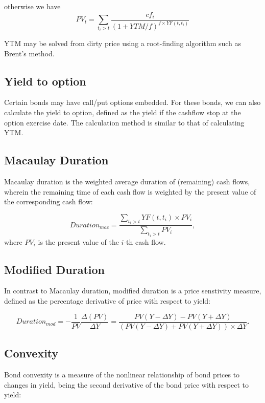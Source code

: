 otherwise we have
\begin{equation}
  PV_t = \sum_{t_i>t} \frac{cf_i}{ (1+YTM/f)^{f\times YF(t,t_i)} }
\end{equation}

YTM may be solved from dirty price using a root-finding algorithm such as
Brent's method. 

\subsection{Yield to option}

Certain bonds may have call/put options embedded. For these bonds, we can 
also calculate the yield to option, defined as the yield if the cashflow stop at
the option exercise date. The calculation method is similar to that of
calculating YTM.

\subsection{Macaulay Duration}
Macaulay duration is the weighted average duration of (remaining) cash flows,
wherein the remaining time of each cash flow is weighted by the present value of
the corresponding cash flow:

\begin{equation}
  Duration_{mac} = \frac{\sum_{t_i>t} YF(t,t_i)\times PV_i}
                        {\sum_{t_i>t} PV_i},
\end{equation}
where $PV_i$ is the present value of the $i$-th cash flow.

\subsection{Modified Duration}
In contrast to Macaulay duration, modified duration is a price senstivity
measure, defined as the percentage derivative of price with respect to yield:

\begin{equation}
  Duration_{mod} = -\frac{1}{PV} \frac{\Delta (PV)}{\Delta Y}
    = \frac{PV(Y-\Delta Y) - PV(Y+\Delta Y)}
                        {(PV(Y-\Delta Y) + PV(Y+\Delta Y)) \times \Delta Y}.
\end{equation}

\subsection{Convexity}
Bond convexity is a measure of the nonlinear relationship of bond prices to
changes in yield, being the second derivative of the bond price with respect to
yield:


